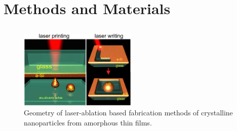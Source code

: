 \section{Methods and Materials}
\label{ch:Exp}

    \subsection{}
    \label{sec:Ablation}

        \begin{figure}[h!]
                \begin{center}
                    \includegraphics[width=0.5\textwidth]{figs/methods/LaserPrinting.eps}
                \end{center}
                \label{fig:LaserPrinting}
                \caption{Geometry of laser-ablation based fabrication methods of crystalline nanoparticles from amorphous
                            thin films.}
        \end{figure}


